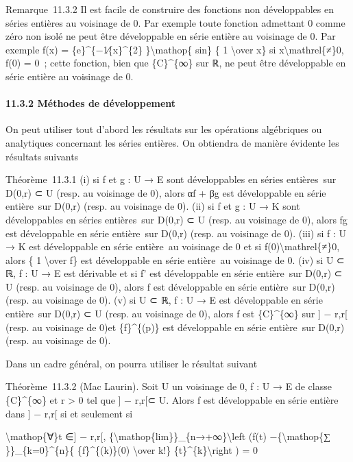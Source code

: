 \documentclass[]{article}
\begin{document}
Remarque~11.3.2 Il est facile de construire des fonctions non
développables en séries entières au voisinage de 0. Par exemple toute
fonction admettant 0 comme zéro non isolé ne peut être développable en
série entière au voisinage de 0. Par exemple f(x) =
\{e\}\^{}\{−1∕\{x\}\^{}\{2\} \}\textbackslash{}mathop\{ sin\} \{ 1
\textbackslash{}over x\} si x\textbackslash{}mathrel\{≠\}0, f(0) = 0~;
cette fonction, bien que \{C\}\^{}\{∞\} sur ℝ, ne peut être développable
en série entière au voisinage de 0.

\paragraph{11.3.2 Méthodes de développement}

On peut utiliser tout d'abord les résultats sur les opérations
algébriques ou analytiques concernant les séries entières. On obtiendra
de manière évidente les résultats suivants

Théorème~11.3.1 (i) si f et g : U → E sont développables en séries
entières~sur D(0,r) ⊂ U (resp. au voisinage de 0), alors αf + βg est
développable en série entière~sur D(0,r) (resp. au voisinage de 0). (ii)
si f et g : U → K sont développables en séries entières~sur D(0,r) ⊂ U
(resp. au voisinage de 0), alors fg est développable en série
entière~sur D(0,r) (resp. au voisinage de 0). (iii) si f : U → K est
développable en série entière~au voisinage de 0 et si
f(0)\textbackslash{}mathrel\{≠\}0, alors \{ 1 \textbackslash{}over f\}
est développable en série entière~au voisinage de 0. (iv) si U ⊂ ℝ, f :
U → E est dérivable et si f' est développable en série entière~sur
D(0,r) ⊂ U (resp. au voisinage de 0), alors f est développable en série
entière~sur D(0,r) (resp. au voisinage de 0). (v) si U ⊂ ℝ, f : U → E
est développable en série entière~sur D(0,r) ⊂ U (resp. au voisinage de
0), alors f est \{C\}\^{}\{∞\} sur {]} − r,r{[} (resp. au voisinage de
0)et \{f\}\^{}\{(p)\} est développable en série entière~sur D(0,r)
(resp. au voisinage de 0).

Dans un cadre général, on pourra utiliser le résultat suivant

Théorème~11.3.2 (Mac Laurin). Soit U un voisinage de 0, f : U → E de
classe \{C\}\^{}\{∞\} et r \textgreater{} 0 tel que {]} − r,r{[}⊂ U.
Alors f est développable en série entière dans {]} − r,r{[} si et
seulement si

\textbackslash{}mathop\{∀\}t ∈{]} − r,r{[},
\{\textbackslash{}mathop\{lim\}\}\_\{n→+∞\}\textbackslash{}left (f(t)
−\{\textbackslash{}mathop\{∑ \}\}\_\{k=0\}\^{}\{n\}\{
\{f\}\^{}\{(k)\}(0) \textbackslash{}over k!\}
\{t\}\^{}\{k\}\textbackslash{}right ) = 0
\end{document}
